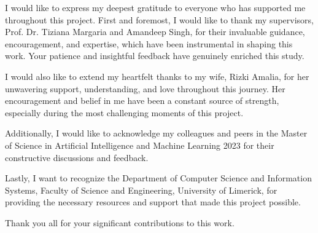
\begin{acknowledgements} %

\noindent   I would like to express my deepest gratitude to everyone who has supported me throughout this project. First and foremost, I would like to thank my supervisors, Prof. Dr. Tiziana Margaria and Amandeep Singh, for their invaluable guidance, encouragement, and expertise, which have been instrumental in shaping this work. Your patience and insightful feedback have genuinely enriched this study. \par \vspace*{1ex}

I would also like to extend my heartfelt thanks to my wife, Rizki Amalia, for her unwavering support, understanding, and love throughout this journey. Her encouragement and belief in me have been a constant source of strength, especially during the most challenging moments of this project. \par \vspace*{1ex}

Additionally, I would like to acknowledge my colleagues and peers in the Master of Science in Artificial Intelligence and Machine Learning 2023 for their constructive discussions and feedback. \par \vspace*{1ex}

Lastly, I want to recognize the Department of Computer Science and Information Systems, Faculty of Science and Engineering, University of Limerick, for providing the necessary resources and support that made this project possible. \par \vspace*{1ex}

Thank you all for your significant contributions to this work.




\end{acknowledgements}

